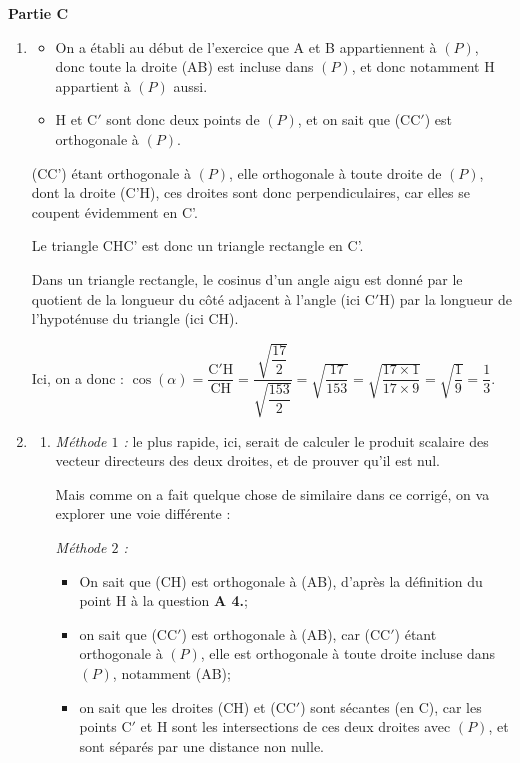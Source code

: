 \documentclass[10pt]{article}
\begin{document}
\medskip

\textbf{Partie C}

\medskip

\begin{enumerate}
	\item \begin{itemize}[left=0mm]
		\item On a établi au début de l'exercice que A et B appartiennent à $(P)$, donc toute la droite (AB) est incluse dans $(P)$, et donc notamment H appartient à $(P)$ aussi.

		\item H et C$'$ sont donc deux points de $(P)$, et on sait que (CC$'$) est orthogonale à $(P)$.
	\end{itemize}

	(CC') étant orthogonale à $(P)$, elle orthogonale à toute droite de $(P)$, dont la droite (C'H), ces droites sont donc perpendiculaires, car elles se coupent évidemment en C'.

	Le triangle CHC' est donc un triangle rectangle en C'.

	Dans un triangle rectangle, le cosinus d'un angle aigu est donné par le quotient de la longueur du côté adjacent à l'angle (ici C$'$H) par la longueur de l'hypoténuse du triangle (ici CH).

	Ici, on a donc : \quad $\cos(\alpha ) = \dfrac{\mathrm{C'H}}{\mathrm{CH}} = \dfrac{\sqrt{\dfrac{17}{2}}}{\sqrt{\dfrac{153}{2}} } = \sqrt{\dfrac{17}{153}} = \sqrt{\dfrac{17\times 1}{17 \times 9}} = \sqrt{\dfrac{1}{9}} = \dfrac13$.

	\item \begin{enumerate}
		\item \emph{Méthode $1$ :} le plus rapide, ici, serait de calculer le produit scalaire des vecteur directeurs des deux droites, et de prouver qu'il est nul.

		\smallskip

Mais comme on a fait quelque chose de similaire dans ce corrigé, on va explorer une voie différente :


	\emph{Méthode $2$ :}
	\begin{itemize}[left=0mm]
		\item On sait que (CH) est orthogonale à (AB), d'après la définition du point H à la question \textbf{A 4.};
		\item on sait que (CC$'$) est orthogonale à (AB), car (CC$'$) étant orthogonale à $(P)$, elle est orthogonale à toute droite incluse dans $(P)$, notamment (AB);
		\item on sait que les droites (CH) et (CC$'$) sont sécantes (en C), car les points C$'$ et H sont les intersections de ces deux droites avec $(P)$, et sont séparés par une distance non nulle.
	\end{itemize}


\end{enumerate}
\end{enumerate}
\end{document}
